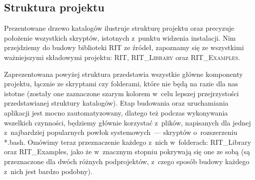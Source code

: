 \subsection{Struktura projektu}



Prezentowane drzewo katalogów ilustruje strukturę projektu oraz precyzuje położenie wszystkich skryptów, istotnych z~punktu widzenia instalacji.
Nim przejdziemy do budowy biblioteki \textsc{RIT} ze źródeł, zapoznamy się ze wszystkimi ważniejszymi składowymi projektu: \textsc{RIT}, \textsc{RIT\_Library} oraz \textsc{RIT\_Examples}.

\small
\noindent{}

Zaprezentowana powyżej struktura przedstawia wszystkie główne komponenty projektu, łącznie ze skryptami czy folderami, które nie będą na razie dla nas istotne (zostały one zaznaczone szarym kolorem w~celu lepszej przejrzystości przedstawianej struktury katalogów).
Etap budowania oraz uruchamiania aplikacji jest mocno zautomatyzowany, dlatego też podczas wykonywania wszelkich czynności, będziemy głównie korzystać z~plików, napisanych dla jednej z~najbardziej popularnych powłok systemowych~--- skryptów o~rozszerzeniu \textsf{*.bash}.
Omówimy teraz przeznaczenie każdego z~nich w~folderach: \textsf{RIT\_Library} oraz  \textsf{RIT\_Examples}, jako że w~znacznym stopniu pokrywają się one ze sobą (są przeznaczone dla dwóch różnych podprojektów, z~czego sposób budowy każdego z~nich jest bardzo podobny).


